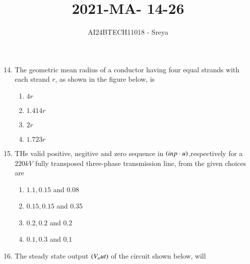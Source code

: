 \documentclass[journal]{IEEEtran}
\begin{document}

\vspace{3cm}

\title{2021-MA- 14-26}
\author{AI24BTECH11018 - Sreya}

{\let\newpage\relax\maketitle}

\renewcommand{\thefigure}{\theenumi}
\renewcommand{\thetable}{\theenumi}
\setlength{\intextsep}{10pt} %

\begin{enumerate}
\setcounter{enumi}{13}
\item The geometric mean radius of a conductor having four equal strands with each strand $r$, as shown in the figure below, is
\begin{figure}[!ht]
\centering
{}%

\label{fig:my_label}
\end{figure}
\begin{enumerate}
    \item $4 r$ 
    \item $1.414 r$
    \item $2 r$
    \item $1.723 r$
\end{enumerate}
\item THe valid positive, negitive and zero sequence in $\left(in p\cdot u\right)$,respectively for a $220 kV$ fully transposed three-phase transmission line, from the given choices are
\begin{enumerate}
    \item $1.1,0.15$ and $0.08$
    \item $0.15,0.15$ and $0.35$
    \item $0.2,0.2$ and $0.2$
    \item $0.1,0.3$ and $0.1$
\end{enumerate}
\item The steady state output $\left(V_out\right)$ of the circuit shown below, will
\begin{figure}[!ht]
\centering
{}
\end{figure}
\end{enumerate}
\end{document}
